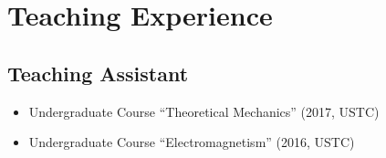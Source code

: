 \section{Teaching Experience}

\subsection{Teaching Assistant}
\begin{itemize}
\item Undergraduate Course ``Theoretical Mechanics'' (2017, USTC)
\item Undergraduate Course ``Electromagnetism'' (2016, USTC)
\end{itemize}

